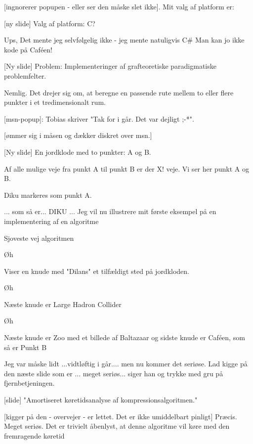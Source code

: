 \documentclass[a4paper,11pt]{article}
\begin{document}
\begin{sketch}
[ingnorerer popupen - eller ser den måske slet ikke]. Mit valg af platform er:

[ny slide] Valg af platform: C?

 Ups, Det mente jeg selvfølgelig ikke - jeg mente natuligvis C\# Man kan jo ikke kode på Caféen! 

[Ny slide] Problem: Implementeringer af grafteoretiske paradigmatiske problemfelter.

 Nemlig. Det drejer sig om, at beregne en passende rute mellem to eller flere punkter i et tredimensionalt rum. 

[msn-popup]: Tobias skriver "Tak for i går. Det var dejligt ;-*".

 [ømmer sig i måsen og dækker diskret over msn.]

[Ny slide] En jordklode med to punkter: A og B.

 Af alle mulige veje fra punkt A til punkt B er der X! veje. Vi ser her punkt A og B. 

 Diku markeres som punkt A.

 ... som så er... DIKU ... Jeg vil nu illustrere mit første eksempel på en implementering af en algoritme 

 Sjoveste vej algoritmen

 Øh 

 Viser en knude med "Dilans" et tilfældigt sted på jordkloden.

 Øh 

 Næste knude er Large Hadron Collider

 Øh 

 Næste knude er Zoo med et billede af Baltazaar og sidste knude er Caféen, som så er Punkt B

 Jeg var måske lidt ...vidtløftig i går.... men nu kommer det seriøse. Lad kigge på den næste slide som er ... meget seriøs... siger han og trykke med gru på fjernbetjeningen.

 [slide] "Amortiseret køretidsanalyse af kompressionsalgoritmen." 

 [kigger på den - overvejer - er lettet. Det er ikke umiddelbart pinligt] Præcis. Meget seriøs. Det er trivielt åbenlyst, at denne algoritme vil køre med den fremragende køretid


\end{sketch}
\end{document}
